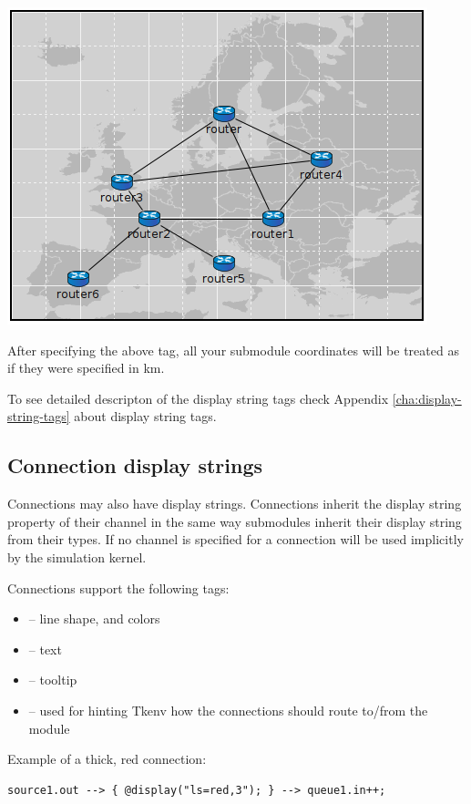\begin{center}
\includegraphics{figures/graphics-bgtags}
\end{center}

After specifying the above  tag, all your submodule coordinates will be treated as if
they were specified in km.

To see detailed descripton of the display string tags check
Appendix \ref{cha:display-string-tags} about display string tags.

\subsection{Connection display strings}

Connections may also have display strings. Connections inherit the
display string property of their channel in the same way submodules inherit
their display string from their types. If no channel is specified for a 
connection  will be used implicitly by the simulation kernel.

Connections support the following tags:
\begin{itemize}
  \item{ -- line shape, and colors}
  \item{ -- text}
  \item{ -- tooltip}
  \item{ -- used for hinting Tkenv how the connections should route to/from the module}
\end{itemize}

Example of a thick, red connection:
\begin{verbatim}
source1.out --> { @display("ls=red,3"); } --> queue1.in++;
\end{verbatim}

